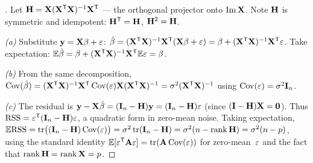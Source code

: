 \begin{proof}[]
Let $\mathbf{H} = \mathbf{X} (\mathbf{X}^{\mathsf{T}} \mathbf{X})^{-1} \mathbf{X}^{\mathsf{T}}$ — the
orthogonal projector onto $\operatorname{Im} \mathbf{X}$. Note $\mathbf{H}$ is symmetric
and idempotent: $\mathbf{H}^{\mathsf{T}} = \mathbf{H}$, $\mathbf{H}^2 = \mathbf{H}$.

\emph{(a)} Substitute $\mathbf{y} = \mathbf{X} \mathbf{\beta} + \mathbf{\varepsilon}$:
$\hat{\mathbf{\beta}} = (\mathbf{X}^{\mathsf{T}} \mathbf{X})^{-1} \mathbf{X}^{\mathsf{T}} (\mathbf{X} \mathbf{\beta} + \mathbf{\varepsilon}) = \mathbf{\beta} + (\mathbf{X}^{\mathsf{T}} \mathbf{X})^{-1} \mathbf{X}^{\mathsf{T}} \mathbf{\varepsilon}$.
Take expectation: $\mathbb{E} \hat{\mathbf{\beta}} = \mathbf{\beta} + (\mathbf{X}^{\mathsf{T}} \mathbf{X})^{-1} \mathbf{X}^{\mathsf{T}} \mathbb{E} \mathbf{\varepsilon} = \mathbf{\beta}$.

\emph{(b)} From the same decomposition,
$\operatorname{Cov}(\hat{\mathbf{\beta}}) = (\mathbf{X}^{\mathsf{T}} \mathbf{X})^{-1} \mathbf{X}^{\mathsf{T}} \operatorname{Cov}(\mathbf{\varepsilon}) \mathbf{X} (\mathbf{X}^{\mathsf{T}} \mathbf{X})^{-1} = \sigma^2 (\mathbf{X}^{\mathsf{T}} \mathbf{X})^{-1}$
using $\operatorname{Cov}(\mathbf{\varepsilon}) = \sigma^2 \mathbf{I}_n$.

\emph{(c)} The residual is
$\mathbf{y} - \mathbf{X} \hat{\mathbf{\beta}} = (\mathbf{I}_n - \mathbf{H}) \mathbf{y} = (\mathbf{I}_n - \mathbf{H}) \mathbf{\varepsilon}$
(since $(\mathbf{I} - \mathbf{H}) \mathbf{X} = \mathbf{0}$). Thus
$\mathrm{RSS} = \mathbf{\varepsilon}^{\mathsf{T}} (\mathbf{I}_n - \mathbf{H}) \mathbf{\varepsilon}$,
a quadratic form in zero-mean noise. Taking expectation,
$\mathbb{E} \mathrm{RSS} = \operatorname{tr}\bigl((\mathbf{I}_n - \mathbf{H}) \operatorname{Cov}(\mathbf{\varepsilon})\bigr) = \sigma^2 \operatorname{tr}(\mathbf{I}_n - \mathbf{H}) = \sigma^2 (n - \operatorname{rank} \mathbf{H}) = \sigma^2 (n - p)$,
using the standard identity $\mathbb{E}[\mathbf{\varepsilon}^{\mathsf{T}} \mathbf{A} \mathbf{\varepsilon}] = \operatorname{tr}(\mathbf{A} \operatorname{Cov}(\mathbf{\varepsilon}))$
for zero-mean~$\mathbf{\varepsilon}$ and the fact that
$\operatorname{rank} \mathbf{H} = \operatorname{rank} \mathbf{X} = p$.
\end{proof}

